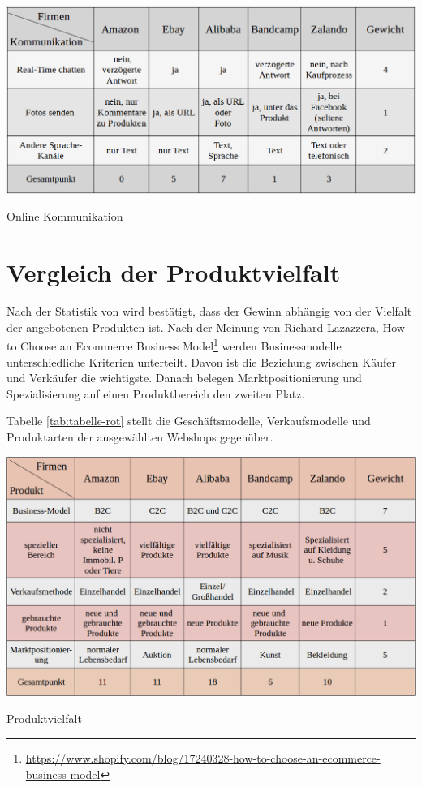 \begin{table}[htbp]
	\centering
	\includegraphics[width=1\textwidth]{bilder/tabelle-grau.png}
	\caption{Online Kommunikation}
	\label{tab:tabelle-grau}
\end{table}


\section{Vergleich der Produktvielfalt}

Nach der Statistik von \textcite{statista} wird bestätigt, dass der Gewinn abhängig von der Vielfalt der angebotenen Produkten ist. Nach der Meinung von Richard Lazazzera, How to Choose an Ecommerce Business Model\footnote{\url{https://www.shopify.com/blog/17240328-how-to-choose-an-ecommerce-business-model}} werden Businessmodelle unterschiedliche Kriterien unterteilt. Davon ist die Beziehung zwischen Käufer und Verkäufer die wichtigste. Danach belegen Marktpositionierung und Spezialisierung auf einen Produktbereich den zweiten Platz.

Tabelle \vref{tab:tabelle-rot} stellt die Geschäftsmodelle, Verkaufsmodelle und Produktarten der ausgewählten Webshops gegenüber.

\begin{table}[htbp]
	\centering
	\includegraphics[width=1\textwidth]{bilder/tabelle-rot.png}
	\caption{Produktvielfalt}
	\label{tab:tabelle-rot}
\end{table}


